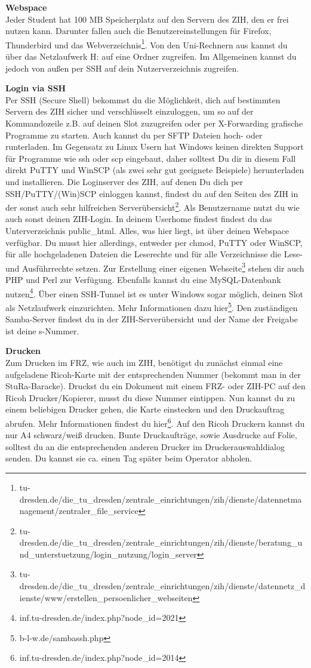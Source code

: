 \textbf{Webspace} \\
Jeder Student hat 100 MB Speicherplatz auf den Servern des ZIH, den er frei nutzen kann.
Darunter fallen auch die Benutzereinstellungen für Firefox, Thunderbird und das Webverzeichnis\footnote{tu-dresden.de/die_tu_dresden/zentrale_einrichtungen/zih/dienste/datennetmanagement/zentraler_file_service}.
Von den Uni-Rechnern aus kannst du über das Netzlaufwerk H: auf eine Ordner zugreifen.
Im Allgemeinen kannst du jedoch von außen per SSH auf dein Nutzerverzeichnis zugreifen.

\textbf{Login via SSH} \\
Per SSH (Secure Shell) bekommst du die Möglichkeit, dich auf bestimmten Servern des ZIH sicher und verschlüsselt einzuloggen, um so auf der Kommandozeile z.B. auf deinen Slot zuzugreifen oder per X-Forwarding grafische Programme zu starten.
Auch kannst du per SFTP Dateien hoch- oder runterladen.
Im Gegensatz zu Linux Usern hat Windows keinen direkten Support für Programme wie ssh oder scp eingebaut, daher solltest Du dir in diesem Fall direkt PuTTY und WinSCP (als zwei sehr gut geeignete Beispiele) herunterladen und installieren.
Die Loginserver des ZIH, auf denen Du dich per SSH/PuTTY/(Win)SCP einloggen kannst, findest du auf den Seiten des ZIH in der sonst auch sehr hilfreichen Serverübersicht\footnote{tu-dresden.de/die_tu_dresden/zentrale_einrichtungen/zih/dienste/beratung_und_unterstuetzung/login_nutzung/login_server}.
Als Benutzername nutzt du wie auch sonst deinen ZIH-Login.
In deinem Userhome findest findest du das Unterverzeichnis public_html.
Alles, was hier liegt, ist über deinen Webspace verfügbar.
Du musst hier allerdings, entweder per chmod, PuTTY oder WinSCP, für alle hochgeladenen Dateien die Leserechte und für alle Verzeichnisse die Lese- und Ausführrechte setzen.
Zur Erstellung einer eigenen Webseite\footnote{tu-dresden.de/die_tu_dresden/zentrale_einrichtungen/zih/dienste/datennetz_dienste/www/erstellen_persoenlicher_webseiten} stehen dir auch PHP und Perl zur Verfügung.
Ebenfalls kannst du eine MySQL-Datenbank nutzen\footnote{inf.tu-dresden.de/index.php?node_id=2021}.
Über einen SSH-Tunnel ist es unter Windows sogar möglich, deinen Slot als Netzlaufwerk einzurichten.
Mehr Informationen dazu hier\footnote{b-l-w.de/sambassh.php}.
Den zuständigen Samba-Server findest du in der ZIH-Serverübersicht und der Name der Freigabe ist deine s-Nummer.

\textbf{Drucken} \\
Zum Drucken im FRZ, wie auch im ZIH, benötigst du zunächst einmal eine aufgeladene Ricoh-Karte mit der entsprechenden Nummer (bekommt man in der StuRa-Baracke).
Druckst du ein Dokument mit einem FRZ- oder ZIH-PC auf den Ricoh Drucker/Kopierer, musst du diese Nummer eintippen.
Nun kannst du zu einem beliebigen Drucker gehen, die Karte einstecken und den Druckauftrag abrufen.
Mehr Informationen findest du hier\footnote{inf.tu-dresden.de/index.php?node_id=2014}.
Auf den Ricoh Druckern kannst du nur A4 schwarz/weiß drucken.
Bunte Druckaufträge, sowie Ausdrucke auf Folie, solltest du an die entsprechenden anderen Drucker im Druckerauswahldialog senden.
Du kannst sie ca. einen Tag später beim Operator abholen.

